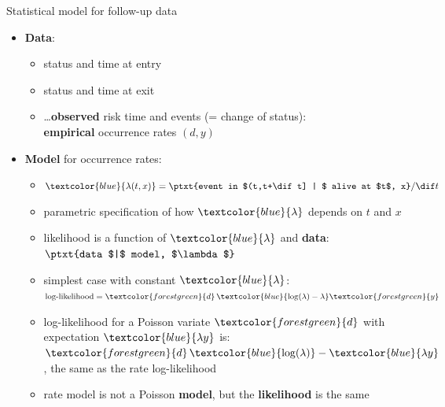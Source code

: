 \begin{frame}{Statistical model for follow-up data}
  \begin{itemize}[<+->]
  \item \textbf{Data}:

    \begin{itemize}
    \item status and time at entry
    \item status and time at exit
    \item \ldots \textbf{observed} risk time and events (= change of status):\\
        \textbf{empirical} occurrence rates $(d, y)$
    \end{itemize}

  \item \textbf{Model} for occurrence rates:

    \begin{itemize}
    \item $\textcolor{blue}{\lambda(t, x)}
          = \ptxt{event in $(t,t+\dif t] | $ alive at $t$, x} / \dif t$
    \item parametric specification of how $\textcolor{blue}{\lambda}$ depends on $t$ and $x$
    \item likelihood is a function of $\textcolor{blue}{\lambda}$ and
      \textbf{data}: $\ptxt{data $|$ model, $\lambda$}$
    \item simplest case with constant $\textcolor{blue}{\lambda}$:
          $\text{log-likelihood} = \textcolor{forestgreen}{d}\,\textcolor{blue}{\log(\lambda)
            - \lambda}\textcolor{forestgreen}{y}$
    \item log-likelihood for a Poisson variate $\textcolor{forestgreen}{d}$ with expectation
  $\textcolor{blue}{\lambda y}$ is:\\
  $\textcolor{forestgreen}{d}\,\textcolor{blue}{\log(\lambda)} - \textcolor{blue}{\lambda y}$,
  the same as the rate log-likelihood
\item rate model is not a Poisson \textbf{model}, but the
  \textbf{likelihood} is the same
  \end{itemize}

  \end{itemize}
\end{frame}

